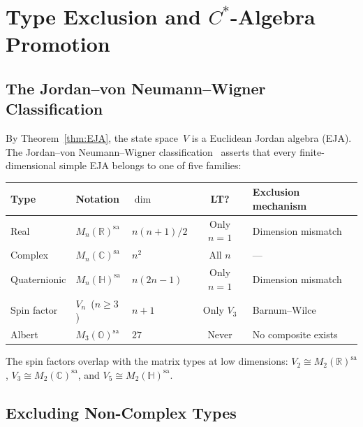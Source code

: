 
\section{Type Exclusion and $C^*$-Algebra Promotion}\label{sec:exclusion}

\subsection{The Jordan--von Neumann--Wigner
Classification}\label{subsec:jvw}

By Theorem~\ref{thm:EJA}, the state space~$V$ is a Euclidean Jordan
algebra (EJA). The Jordan--von Neumann--Wigner
classification~\cite{JordanVonNeumannWigner1934} asserts that every finite-dimensional
simple EJA belongs to one of five families:

\begin{center}
\begin{tabular}{lllcl}
\toprule
Type & Notation & $\dim$ & LT? & Exclusion mechanism \\
\midrule
Real & $M_n(\mathbb{R})^{\mathrm{sa}}$ & $n(n{+}1)/2$
  & Only $n{=}1$ & Dimension mismatch \\
Complex & $M_n(\mathbb{C})^{\mathrm{sa}}$ & $n^2$
  & All $n$ & --- \\
Quaternionic & $M_n(\mathbb{H})^{\mathrm{sa}}$ & $n(2n{-}1)$
  & Only $n{=}1$ & Dimension mismatch \\
Spin factor & $V_n$ \,($n \ge 3$) & $n{+}1$
  & Only $V_3$ & Barnum--Wilce \\
Albert & $M_3(\mathbb{O})^{\mathrm{sa}}$ & $27$
  & Never & No composite exists \\
\bottomrule
\end{tabular}
\end{center}

\noindent
The spin factors overlap with the matrix types at low dimensions:
$V_2 \cong M_2(\mathbb{R})^{\mathrm{sa}}$,
$V_3 \cong M_2(\mathbb{C})^{\mathrm{sa}}$, and
$V_5 \cong M_2(\mathbb{H})^{\mathrm{sa}}$.

\subsection{Excluding Non-Complex Types}\label{subsec:exclusion}

